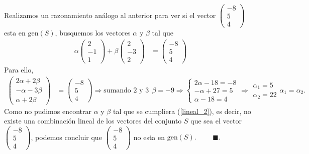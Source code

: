 \documentclass[11pt,letterpaper]{article}
\newcommand{\fin}{$\blacksquare.$}
\newcommand{\gen}{\text{gen}}
\begin{document}
\begin{enumerate}
Realizamos un razonamiento análogo al anterior para ver si el vector $\begin{pmatrix}
-8\\
5\\
4
\end{pmatrix}$ esta en $\gen (S)$, busquemos los vectores $\alpha$ y $\beta$ tal que 
\begin{align}\label{lineal_2}
\alpha \begin{pmatrix}
2\\
-1\\
1
\end{pmatrix}+\beta \begin{pmatrix}
2\\
-3\\
2
\end{pmatrix}&=\begin{pmatrix}
-8\\
5\\
4
\end{pmatrix}
\end{align}
Para ello,
\begin{align*}
\begin{pmatrix}
2\alpha+2\beta\\
-\alpha-3\beta\\
\alpha+2\beta
\end{pmatrix}&=\begin{pmatrix}
-8\\
5\\
4
\end{pmatrix}\Rightarrow\text{sumando 2 y 3}\ \ 
\beta=-9 \Rightarrow \left\{\begin{matrix}
2\alpha-18=-8\\
-\alpha+27=5\\
\alpha-18=4
\end{matrix}\right.\Rightarrow
\begin{array}{cc}
\alpha_1=5\\
\alpha_2=22
\end{array}\alpha_1=\alpha_2.
\end{align*}
Como no pudimos encontrar $\alpha$ y $\beta$ tal que se cumpliera (\ref{lineal_2}), es decir, no existe una combinación lineal de los vectores del conjunto $S$ que sea el vector $\begin{pmatrix}
-8\\
5\\
4
\end{pmatrix}$,  podemos concluir que $\begin{pmatrix}
-8\\
5\\
4
\end{pmatrix}$ no esta en $\gen (S).$ \ \ \ \ \fin


\end{enumerate}
\end{document}
